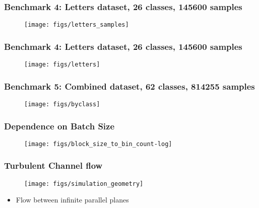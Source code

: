 \documentclass[aspectratio=169]{beamer}
\begin{document}
\begin{frame}
    \frametitle{Benchmark 4: Letters dataset, 26 classes, 145600 samples}
    \begin{figure}
        \centering
        \texttt{[image: figs/letters\_samples]}
    \end{figure}
\end{frame}
\begin{frame}
    \frametitle{Benchmark 4: Letters dataset, 26 classes, 145600 samples}
    \begin{figure}
        \centering
        \texttt{[image: figs/letters]}
    \end{figure}
\end{frame}
\begin{frame}
    \frametitle{Benchmark 5: Combined dataset, 62 classes, 814255 samples}
    \begin{figure}
        \centering
        \texttt{[image: figs/byclass]}
    \end{figure}
\end{frame}
\begin{frame}
    \frametitle{Dependence on Batch Size}
    \begin{figure}
        \centering
        \texttt{[image: figs/block\_size\_to\_bin\_count-log]}
    \end{figure}
\end{frame}
\begin{frame}
    \frametitle{Turbulent Channel flow}
  \vspace{6pt}
  \begin{figure}
    \texttt{[image: figs/simulation\_geometry]}
  \end{figure}
  \begin{itemize}
  \item Flow between infinite parallel planes
  \end{itemize}
  \vspace{6pt}
\end{frame}
\end{document}
